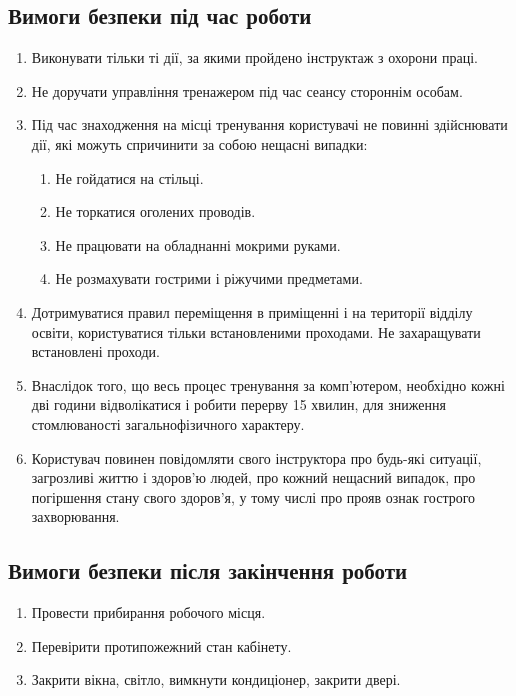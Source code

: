 \subsection{Вимоги безпеки під час роботи}
\begin{enumerate}
  \item Виконувати тільки ті дії, за якими пройдено інструктаж з охорони праці.
  \item Не доручати управління тренажером під час сеансу стороннім особам.
  \item Під час знаходження на місці тренування користувачі не повинні здійснювати дії,
    які можуть спричинити за собою нещасні випадки:
    \begin{enumerate}
      \item Не гойдатися на стільці.
      \item Не торкатися оголених проводів.
      \item Не працювати на обладнанні мокрими руками.
      \item Не розмахувати гострими і ріжучими предметами.
    \end{enumerate}
  \item Дотримуватися правил переміщення в приміщенні і на території відділу освіти,
    користуватися тільки встановленими проходами. Не захаращувати встановлені проходи.
  \item Внаслідок того, що весь процес тренування за комп'ютером, необхідно кожні дві години
    відволікатися і робити перерву 15 хвилин, для зниження стомлюваності
    загальнофізичного характеру.
  \item Користувач повинен повідомляти свого інструктора про будь-які ситуації,
    загрозливі життю і здоров'ю людей, про кожний нещасний випадок,
    про погіршення стану свого здоров'я,
    у тому числі про прояв ознак гострого захворювання.
\end{enumerate}
\newpage
\subsection{Вимоги безпеки після закінчення роботи}
\begin{enumerate}
  \item Провести прибирання робочого місця.
  \item Перевірити протипожежний стан кабінету.
  \item Закрити вікна, світло, вимкнути кондиціонер, закрити двері.
\end{enumerate}
\newpage
